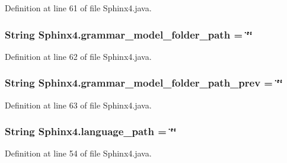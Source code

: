 Definition at line 61 of file Sphinx4.\-java.

\hypertarget{classSphinx4_a67a790a4ce8aa6a14e4614a6799976e4}{
\subsubsection[{grammar\-\_\-model\-\_\-folder\-\_\-path}]{\setlength{\rightskip}{0pt plus 5cm}String Sphinx4.\-grammar\-\_\-model\-\_\-folder\-\_\-path = \char`\"{}\char`\"{}\hspace{0.3cm}{\ttfamily [static]}}}\label{classSphinx4_a67a790a4ce8aa6a14e4614a6799976e4}


Definition at line 62 of file Sphinx4.\-java.

\hypertarget{classSphinx4_a703bb949692410a0d634318e07b3ad1c}{
\subsubsection[{grammar\-\_\-model\-\_\-folder\-\_\-path\-\_\-prev}]{\setlength{\rightskip}{0pt plus 5cm}String Sphinx4.\-grammar\-\_\-model\-\_\-folder\-\_\-path\-\_\-prev = \char`\"{}\char`\"{}\hspace{0.3cm}{\ttfamily [static]}}}\label{classSphinx4_a703bb949692410a0d634318e07b3ad1c}


Definition at line 63 of file Sphinx4.\-java.

\hypertarget{classSphinx4_a83b681a3d5235f0ab8456e7b3de6c522}{
\subsubsection[{language\-\_\-path}]{\setlength{\rightskip}{0pt plus 5cm}String Sphinx4.\-language\-\_\-path = \char`\"{}\char`\"{}\hspace{0.3cm}{\ttfamily [static]}}}\label{classSphinx4_a83b681a3d5235f0ab8456e7b3de6c522}


Definition at line 54 of file Sphinx4.\-java.

